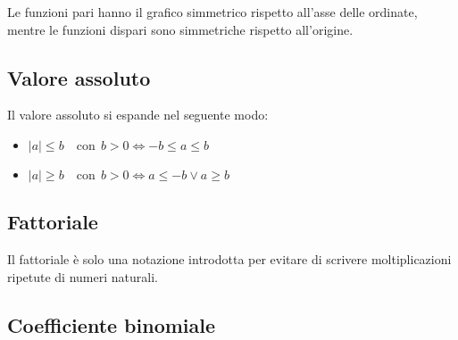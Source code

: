 Le funzioni pari hanno il grafico simmetrico rispetto all'asse delle ordinate, mentre le funzioni dispari sono simmetriche rispetto all'origine.

\subsection{Valore assoluto}


Il valore assoluto si espande nel seguente modo:
\begin{itemize}
    \item $|a| \leq b \quad \mathrm{con}\;\, b > 0 \iff -b \leq a \leq b$
    \item $|a| \geq b \quad \mathrm{con}\;\, b > 0 \iff a \leq -b \lor a \geq b$
\end{itemize}

\subsection{Fattoriale}
Il fattoriale è solo una notazione introdotta per evitare di scrivere moltiplicazioni ripetute di numeri naturali.

\subsection{Coefficiente binomiale} \label{sec_coefficiente-binomiale}

